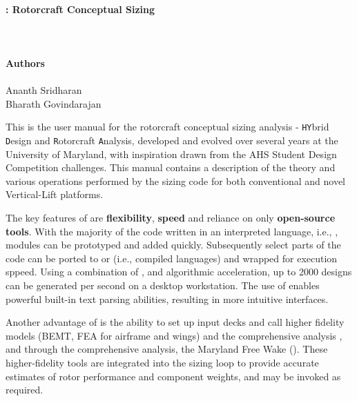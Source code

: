 
\thispagestyle{empty}
\hbox{\ }
\vspace{1in}
\renewcommand{\baselinestretch}{1}
\small\normalsize
\begin{center}
\large{\textbf{\hydra: Rotorcraft Conceptual Sizing}}\\
\ \\
\large{ }
\ \\
\ \\
\textbf{Authors}
\ \\
\ \\
Ananth Sridharan \\
Bharath Govindarajan \\
\end{center}
\noindent
This is the user manual for the rotorcraft conceptual sizing  analysis \textbf{\hydra} - \texttt{HY}brid \texttt{D}esign and \texttt{R}otorcraft \texttt{A}nalysis, developed and evolved over several years at the University of Maryland, with inspiration  drawn from the AHS Student Design Competition challenges. This manual contains a description of the theory and various operations performed by the sizing code for both conventional and novel Vertical-Lift platforms.
\vspace{0.5cm}

The key features of \hydra \spc are \textbf{flexibility}, \textbf{speed} and reliance on only \textbf{open-source tools}. With the majority of the code written in an interpreted language, i.e., \python, modules can be prototyped and added quickly. Subsequently select parts of the code can be ported to  or  (i.e., compiled languages) and wrapped for execution sppeed. Using a combination of ,  and algorithmic acceleration, up to 2000 designs can be generated per second on a desktop workstation. The use of \python enables powerful built-in text parsing abilities, resulting in more intuitive interfaces. 
\vspace{0.5cm}

\noindent Another advantage of \hydra \spc is the ability to set up input decks and call higher fidelity models (BEMT, FEA for airframe and wings) and the comprehensive analysis , and through the comprehensive analysis, the Maryland Free Wake (). These higher-fidelity tools are integrated into the sizing loop to provide accurate estimates of rotor performance and component weights, and may be invoked as required.
\vspace{0.5cm} 

